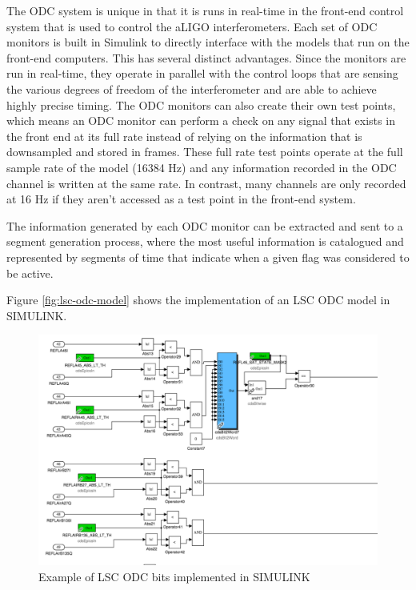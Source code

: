 The ODC system is unique in that it is runs in real-time in the front-end control
system that is used to control the aLIGO interferometers. Each set of ODC monitors
is built in Simulink to directly interface with the models that run on the front-end
computers. This has several distinct advantages.
Since the monitors are run in real-time, they operate in parallel with the control
loops that are sensing the various degrees of freedom of the interferometer and are
able to achieve highly precise timing. The ODC monitors can also create their own
test points, which means an ODC monitor can perform a check on any signal that exists
in the front end at its full rate instead of relying on the information that is
downsampled and stored in frames.
These full rate test points operate at the full sample rate of the model (16384 Hz)
and any information recorded in the ODC channel is written at the same rate. In contrast,
many channels are only recorded at 16 Hz if they aren't accessed as a test point in the front-end system.

The information generated by each ODC monitor can be extracted and sent to a segment
generation process, where the most useful information is catalogued and represented by
segments of time that indicate when a given flag was considered to be active.

Figure \ref{fig:lsc-odc-model} shows the implementation of an LSC ODC 
model in SIMULINK. 

\begin{figure}[ht!]
\includegraphics[width=\textwidth]{figures/ODC/LSC-ODC-model}
\caption[LSC ODC SIMULINK Model Example]{Example of LSC ODC bits implemented in SIMULINK}
\end{figure}\label{fig:lsc-odc-model}

